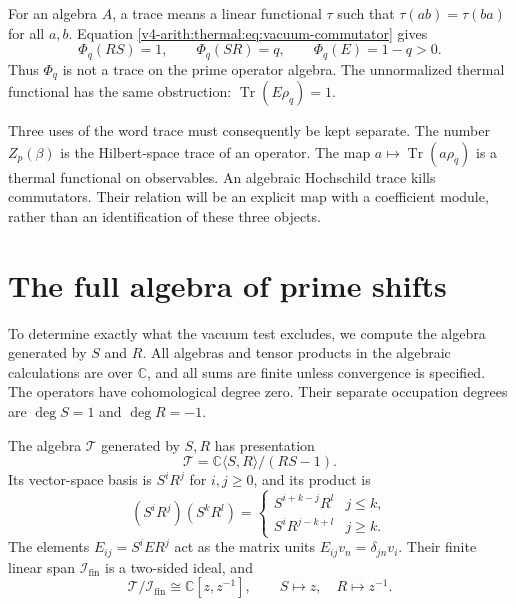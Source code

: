 For an algebra $A$, a trace means a linear functional $\tau$ such
that $\tau(ab)=\tau(ba)$ for all $a,b$. Equation
\eqref{v4-arith:thermal:eq:vacuum-commutator} gives
\begin{equation}
 \Phi_q(RS)=1,\qquad \Phi_q(SR)=q,
 \qquad \Phi_q(E)=1-q>0.
 \label{v4-arith:thermal:eq:noncyclic-test}
\end{equation}
Thus $\Phi_q$ is not a trace on the prime operator algebra. The
unnormalized thermal functional has the same obstruction:
$\operatorname{Tr}(E\rho_q)=1$.

Three uses of the word trace must consequently be kept separate.
The number $Z_p(\beta)$ is the Hilbert-space trace of an operator.
The map $a\mapsto\operatorname{Tr}(a\rho_q)$ is a thermal
functional on observables. An algebraic Hochschild trace kills
commutators. Their relation will be an explicit map with a
coefficient module, rather than an identification of these three
objects.

\section{The full algebra of prime shifts}

To determine exactly what the vacuum test excludes, we compute the
algebra generated by $S$ and $R$. All algebras and tensor products
in the algebraic calculations are over $\mathbb C$, and all sums
are finite unless convergence is specified. The operators have
cohomological degree zero. Their separate occupation degrees are
$\deg S=1$ and $\deg R=-1$.

\begin{proposition}
\label{v4-arith:thermal:prop:normal-form}
The algebra $\mathcal T$ generated by $S,R$ has presentation
\[
 \mathcal T=\mathbb C\langle S,R\rangle/(RS-1).
\]
Its vector-space basis is $S^iR^j$ for $i,j\geq0$, and its product is
\begin{equation}
 (S^iR^j)(S^kR^l)=
 \begin{cases}
 S^{i+k-j}R^l&j\leq k,\\
 S^iR^{j-k+l}&j\geq k.
 \end{cases}
 \label{v4-arith:thermal:eq:normal-product}
\end{equation}
The elements $E_{ij}=S^iER^j$ act as the matrix units
$E_{ij}v_n=\delta_{jn}v_i$. Their finite linear span
$\mathcal I_{\mathrm{fin}}$ is a two-sided ideal, and
\begin{equation}
 \mathcal T/\mathcal I_{\mathrm{fin}}\cong\mathbb C[z,z^{-1}],
 \qquad S\mapsto z,\quad R\mapsto z^{-1}.
 \label{v4-arith:thermal:eq:symbol-quotient}
\end{equation}
\end{proposition}


